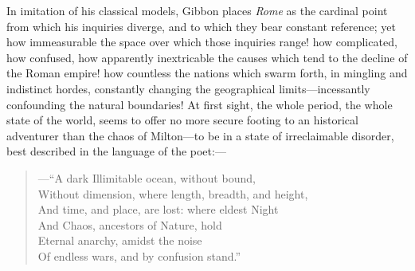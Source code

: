 In imitation of his classical models, Gibbon places \textit{Rome} as the cardinal point from which his inquiries diverge, and to which they bear constant reference; yet how immeasurable the space over which those inquiries range! how complicated, how confused, how apparently inextricable the causes which tend to the decline of the Roman empire! how countless the nations which swarm forth, in mingling and indistinct hordes, constantly changing the geographical limits—incessantly confounding the natural boundaries! At first sight, the whole period, the whole state of the world, seems to offer no more secure footing to an historical adventurer than the chaos of Milton—to be in a state of irreclaimable disorder, best described in the language of the poet:—
\begin{verse}
—“A dark Illimitable ocean, without bound,\\
Without dimension, where length, breadth, and height,\\
And time, and place, are lost: where eldest Night\\
And Chaos, ancestors of Nature, hold\\
Eternal anarchy, amidst the noise\\
Of endless wars, and by confusion stand.”
\end{verse}
